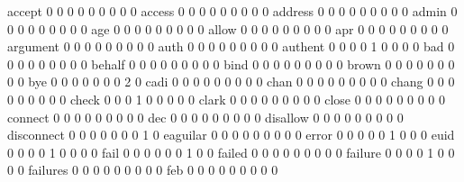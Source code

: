 \documentclass[compress,8pt]{beamer}
\begin{document}
\begin{frame}
\begin{Schunk}
  accept                                     0   0   0   0   0   0   0   0   0
  access                                     0   0   0   0   0   0   0   0   0
  address                                    0   0   0   0   0   0   0   0   0
  admin                                      0   0   0   0   0   0   0   0   0
  age                                        0   0   0   0   0   0   0   0   0
  allow                                      0   0   0   0   0   0   0   0   0
  apr                                        0   0   0   0   0   0   0   0   0
  argument                                   0   0   0   0   0   0   0   0   0
  auth                                       0   0   0   0   0   0   0   0   0
  authent                                    0   0   0   0   1   0   0   0   0
  bad                                        0   0   0   0   0   0   0   0   0
  behalf                                     0   0   0   0   0   0   0   0   0
  bind                                       0   0   0   0   0   0   0   0   0
  brown                                      0   0   0   0   0   0   0   0   0
  bye                                        0   0   0   0   0   0   0   2   0
  cadi                                       0   0   0   0   0   0   0   0   0
  chan                                       0   0   0   0   0   0   0   0   0
  chang                                      0   0   0   0   0   0   0   0   0
  check                                      0   0   0   1   0   0   0   0   0
  clark                                      0   0   0   0   0   0   0   0   0
  close                                      0   0   0   0   0   0   0   0   0
  connect                                    0   0   0   0   0   0   0   0   0
  dec                                        0   0   0   0   0   0   0   0   0
  disallow                                   0   0   0   0   0   0   0   0   0
  disconnect                                 0   0   0   0   0   0   0   1   0
  eaguilar                                   0   0   0   0   0   0   0   0   0
  error                                      0   0   0   0   0   1   0   0   0
  euid                                       0   0   0   0   1   0   0   0   0
  fail                                       0   0   0   0   0   0   1   0   0
  failed                                     0   0   0   0   0   0   0   0   0
  failure                                    0   0   0   0   1   0   0   0   0
  failures                                   0   0   0   0   0   0   0   0   0
  feb                                        0   0   0   0   0   0   0   0   0

\end{Schunk}
\end{frame}
\end{document}
